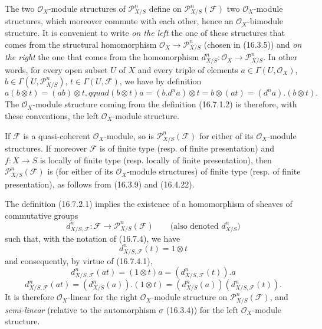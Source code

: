 \begin{env}[16.7.4]
\label{IV.16.7.4}
The two $\mathcal{O}_X$-module structures of $\mathscr{P}_{X/S}^n$
define on $\mathscr{P}_{X/S}^n(\mathscr{F})$ two
$\mathcal{O}_X$-module structures, which moreover commute with each other,
hence an $\mathcal{O}_X$-bimodule structure. It is convenient to write
\emph{on the left} the one of these structures that comes from the structural
homomorphism $\mathcal{O}_X\to\mathscr{P}_{X/S}^n$ (chosen in (16.3.5)) and
\emph{on the right} the one that comes from the homomorphism
$d_{X/S}^n:\mathcal{O}_X\to\mathscr{P}_{X/S}^n$. In other words, for every
open subset $U$ of $X$ and every triple of elements
$a\in\Gamma(U,\mathcal{O}_X)$, $b\in\Gamma(U,\mathscr{P}_{X/S}^n)$,
$t\in\Gamma(U,\mathscr{F})$, we have by definition
\[
  a(b\otimes t)=(ab)\otimes t,qquad
  (b\otimes t)a=(b.d^na)\otimes t=b\otimes(at)
  =(d^na).(b\otimes t).
  \tag{16.7.4.1}
  \label{IV.16.7.4.1}
\]
The $\mathcal{O}_X$-module structure coming from the definition (16.7.1.2)
is therefore, with these conventions, the left $\mathcal{O}_X$-module
structure.

If $\mathscr{F}$ is a quasi-coherent $\mathcal{O}_X$-module, so is
$\mathscr{P}_{X/S}^n(\mathscr{F})$ for either of its
$\mathcal{O}_X$-module structures. If moreover $\mathscr{F}$ is of finite
type (resp. of finite presentation) and $f:X\to S$ is locally of finite type
(resp. locally of finite presentation), then
$\mathscr{P}_{X/S}^n(\mathscr{F})$ is (for either of its
$\mathcal{O}_X$-module structures) of finite type (resp. of finite
presentation), as follows from (16.3.9) and (16.4.22).
\end{env}

\begin{env}[16.7.5]
\label{IV.16.7.5}
The definition (16.7.2.1) implies the existence of a homomorphism of sheaves
of commutative groups
\[
  d_{X/S,\mathscr{F}}^n:\mathscr{F}
  \longrightarrow\mathscr{P}_{X/S}^n(\mathscr{F})
  \qquad\text{(also denoted $d_{X/S}^n$)}
  \tag{16.7.5.1}
  \label{IV.16.7.5.1}
\]
such that, with the notation of (16.7.4), we have
\[
  d_{X/S,\mathscr{F}}^n(t)=1\otimes t
  \tag{16.7.5.2}
  \label{IV.16.7.5.2}
\]
and consequently, by virtue of (16.7.4.1),
\[
  d_{X/S,\mathscr{F}}^n(at)
  =(1\otimes t)a=(d_{X/S,\mathscr{F}}^n(t)).a
  \tag{16.7.5.3}
  \label{IV.16.7.5.3}
\]
\[
  d_{X/S,\mathscr{F}}^n(at)
  =(d_{X/S}^n(a)).(1\otimes t)
  =(d_{X/S}^n(a))(d_{X/S,\mathscr{F}}^n(t)).
  \tag{16.7.5.4}
  \label{IV.16.7.5.4}
\]
It is therefore $\mathcal{O}_X$-linear for the right
$\mathcal{O}_X$-module structure on $\mathscr{P}_{X/S}^n(\mathscr{F})$, and
\emph{semi-linear} (relative to the automorphism $\sigma$ (16.3.4)) for
the left $\mathcal{O}_X$-module structure.
\end{env}

